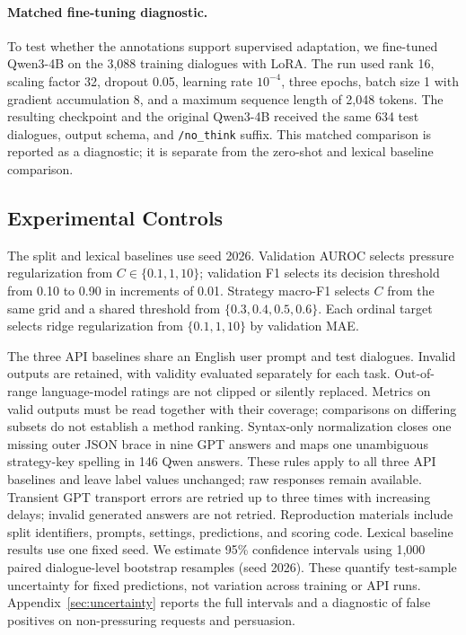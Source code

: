 \documentclass[11pt]{article}
\begin{document}
\paragraph{Matched fine-tuning diagnostic.}
To test whether the annotations support supervised adaptation, we fine-tuned
Qwen3-4B on the 3,088 training dialogues with LoRA. The run used rank 16,
scaling factor 32, dropout 0.05, learning rate $10^{-4}$, three epochs,
batch size 1 with gradient accumulation 8, and a maximum sequence length of
2,048 tokens. The resulting checkpoint and the original Qwen3-4B received
the same 634 test dialogues, output schema, and \texttt{/no\_think} suffix.
This matched comparison is reported as a diagnostic; it is separate from the
zero-shot and lexical baseline comparison.

\subsection{Experimental Controls}
The split and lexical baselines use seed 2026. Validation AUROC selects
pressure regularization from $C\in\{0.1,1,10\}$; validation F1 selects its
decision threshold from 0.10 to 0.90 in increments of 0.01. Strategy
macro-F1 selects $C$ from the same grid and a shared threshold from
$\{0.3,0.4,0.5,0.6\}$. Each ordinal target selects ridge regularization
from $\{0.1,1,10\}$ by validation MAE.

The three API baselines share an English user prompt and test dialogues.
Invalid outputs are retained, with validity evaluated separately
for each task. Out-of-range language-model ratings are not clipped or
silently replaced. Metrics on valid outputs must be read together with
their coverage; comparisons on differing subsets do not establish a
method ranking. Syntax-only normalization closes one missing outer JSON
brace in nine GPT answers and maps one unambiguous strategy-key spelling
in 146 Qwen answers. These rules apply to all three API baselines and leave label values
unchanged; raw responses remain available. Transient GPT transport errors are retried up to three
times with increasing delays; invalid generated answers are not retried.
Reproduction materials include split identifiers, prompts, settings,
predictions, and scoring code. Lexical baseline results use one fixed seed.
We estimate 95\% confidence intervals using 1,000 paired dialogue-level
bootstrap resamples (seed 2026). These quantify test-sample uncertainty
for fixed predictions, not variation across training or API runs.
Appendix~\ref{sec:uncertainty} reports the full intervals and a diagnostic
of false positives on non-pressuring requests and persuasion.
\end{document}
